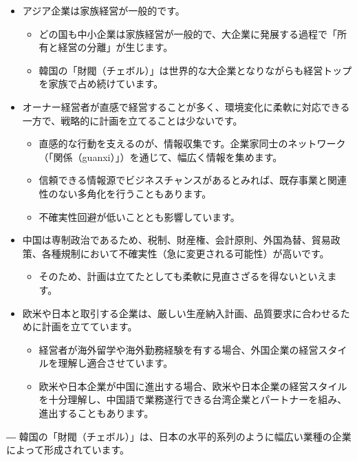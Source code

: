 \documentclass[
]{book}
\providecommand{\tightlist}{%
  \setlength{\itemsep}{0pt}\setlength{\parskip}{0pt}}
\begin{document}
\begin{itemize}
\item
  アジア企業は家族経営が一般的です。

  \begin{itemize}
  \item
    どの国も中小企業は家族経営が一般的で、大企業に発展する過程で「所有と経営の分離」が生じます。
  \item
    韓国の「財閥（チェボル）」は世界的な大企業となりながらも経営トップを家族で占め続けています。
  \end{itemize}
\item
  オーナー経営者が直感で経営することが多く、環境変化に柔軟に対応できる一方で、戦略的に計画を立てることは少ないです。

  \begin{itemize}
  \item
    直感的な行動を支えるのが、情報収集です。企業家同士のネットワーク（「関係（guanxi）」）を通じて、幅広く情報を集めます。
  \item
    信頼できる情報源でビジネスチャンスがあるとみれば、既存事業と関連性のない多角化を行うこともあります。
  \item
    不確実性回避が低いこととも影響しています。
  \end{itemize}
\item
  中国は専制政治であるため、税制、財産権、会計原則、外国為替、貿易政策、各種規制において不確実性（急に変更される可能性）が高いです。

  \begin{itemize}
  \tightlist
  \item
    そのため、計画は立てたとしても柔軟に見直さざるを得ないといえます。
  \end{itemize}
\item
  欧米や日本と取引する企業は、厳しい生産納入計画、品質要求に合わせるために計画を立てています。

  \begin{itemize}
  \item
    経営者が海外留学や海外勤務経験を有する場合、外国企業の経営スタイルを理解し適合させています。
  \item
    欧米や日本企業が中国に進出する場合、欧米や日本企業の経営スタイルを十分理解し、中国語で業務遂行できる台湾企業とパートナーを組み、進出することもあります。
  \end{itemize}
\end{itemize}

― 韓国の「財閥（チェボル）」は、日本の水平的系列のように幅広い業種の企業によって形成されています。
\end{document}
